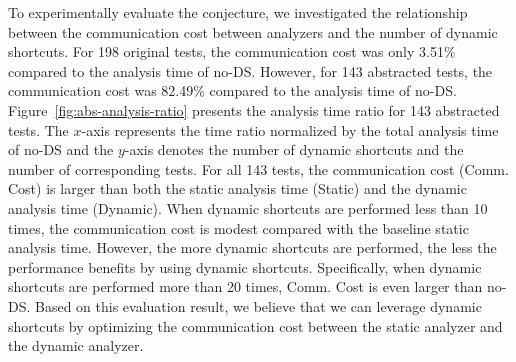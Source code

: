 To experimentally evaluate the conjecture, we investigated the relationship between
the communication cost between analyzers and the number of dynamic shortcuts.
For 198 original tests, the communication cost was only
3.51\% compared to the analysis time of no-DS.  However, for 143
abstracted tests, the communication cost was 82.49\% compared to the analysis
time of no-DS.  Figure~\ref{fig:abs-analysis-ratio} presents the
analysis time ratio for 143 abstracted tests.
The $x$-axis represents the time ratio normalized by the total analysis time of
no-DS and the $y$-axis denotes the number of dynamic
shortcuts and the number of corresponding tests.
For all 143 tests, the communication cost (Comm. Cost) is larger than
both the static analysis time (Static) and the dynamic analysis
time (Dynamic).  When dynamic shortcuts are performed less than 10 times,
the communication cost is modest compared with the baseline static
analysis time.  However, the more dynamic shortcuts are performed,
the less the performance benefits by using dynamic shortcuts.
Specifically, when dynamic shortcuts are performed more than
20 times, Comm. Cost is even larger than no-DS.
Based on this evaluation result, we believe that we can leverage
dynamic shortcuts by optimizing the communication cost between
the static analyzer and the dynamic analyzer.

